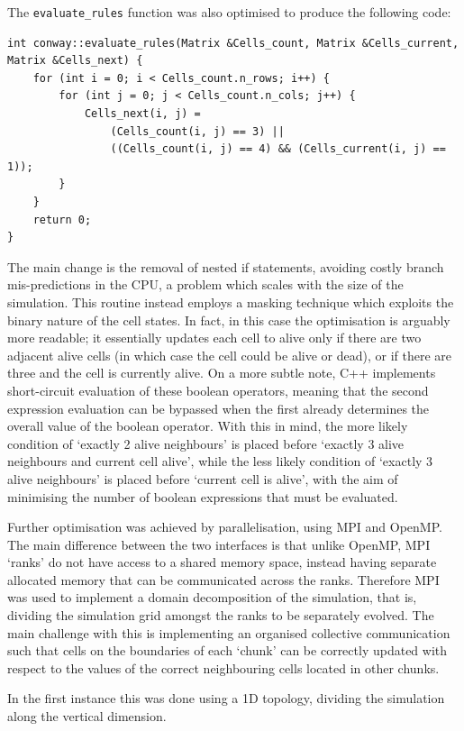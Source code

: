 \documentclass[12pt]{article}
\begin{document}
The \texttt{evaluate\_rules} function was also optimised to produce the following code:

\pagebreak

\begin{lstlisting}
int conway::evaluate_rules(Matrix &Cells_count, Matrix &Cells_current, Matrix &Cells_next) {
    for (int i = 0; i < Cells_count.n_rows; i++) {
        for (int j = 0; j < Cells_count.n_cols; j++) {
            Cells_next(i, j) =
                (Cells_count(i, j) == 3) ||
                ((Cells_count(i, j) == 4) && (Cells_current(i, j) == 1));
        }
    }
    return 0;
}
\end{lstlisting}

The main change is the removal of nested if statements, avoiding costly branch mis-predictions in the CPU, a problem which scales with the size of the simulation.
This routine instead employs a masking technique which exploits the binary nature of the cell states.
In fact, in this case the optimisation is arguably more readable;
it essentially updates each cell to alive only if there are two adjacent alive cells (in which case the cell could be alive or dead),
or if there are three and the cell is currently alive.
On a more subtle note, C++ implements short-circuit evaluation of these boolean operators,
meaning that the second expression evaluation can be bypassed when the first
already determines the overall value of the boolean operator.
With this in mind, the more likely condition of `exactly 2 alive neighbours' is placed before `exactly 3 alive neighbours and current cell alive',
while the less likely condition of `exactly 3 alive neighbours' is placed before `current cell is alive',
with the aim of minimising the number of boolean expressions that must be evaluated.

Further optimisation was achieved by parallelisation, using MPI and OpenMP.
The main difference between the two interfaces is that unlike OpenMP, MPI `ranks' do not have access to a shared memory space,
instead having separate allocated memory that can be communicated across the ranks.
Therefore MPI was used to implement a domain decomposition of the simulation, that is,
dividing the simulation grid amongst the ranks to be separately evolved.
The main challenge with this is implementing an organised collective communication such that cells on the boundaries of each `chunk'
can be correctly updated with respect to the values of the correct neighbouring cells located in other chunks.

In the first instance this was done using a 1D topology, dividing the simulation along the vertical dimension.
\end{document}
